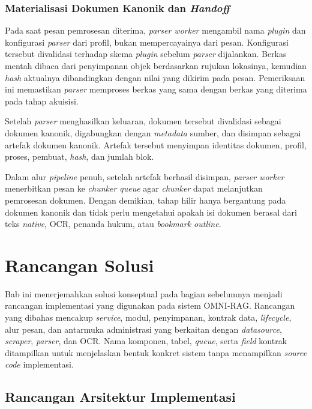 \subsubsection{Materialisasi Dokumen Kanonik dan \textit{Handoff}}
\label{sec:solusi-penyerahan-parser}

Pada saat pesan pemrosesan diterima, \textit{parser worker} mengambil nama \textit{plugin} dan konfigurasi \textit{parser} dari profil, bukan mempercayainya dari pesan.
Konfigurasi tersebut divalidasi terhadap skema \textit{plugin} sebelum \textit{parser} dijalankan.
Berkas mentah dibaca dari penyimpanan objek berdasarkan rujukan lokasinya, kemudian \textit{hash} aktualnya dibandingkan dengan nilai yang dikirim pada pesan.
Pemeriksaan ini memastikan \textit{parser} memproses berkas yang sama dengan berkas yang diterima pada tahap akuisisi.

Setelah \textit{parser} menghasilkan keluaran, dokumen tersebut divalidasi sebagai dokumen kanonik, digabungkan dengan \textit{metadata} sumber, dan disimpan sebagai artefak dokumen kanonik.
Artefak tersebut menyimpan identitas dokumen, profil, proses, pembuat, \textit{hash}, dan jumlah blok.

Dalam alur \textit{pipeline} penuh, setelah artefak berhasil disimpan, \textit{parser worker} menerbitkan pesan ke \textit{chunker queue} agar \textit{chunker} dapat melanjutkan pemrosesan dokumen.
Dengan demikian, tahap hilir hanya bergantung pada dokumen kanonik dan tidak perlu mengetahui apakah isi dokumen berasal dari teks \textit{native}, OCR, penanda hukum, atau \textit{bookmark outline}.

\section{Rancangan Solusi}
\label{sec:rancangan-solusi}

Bab ini menerjemahkan solusi konseptual pada bagian sebelumnya menjadi rancangan implementasi yang digunakan pada sistem OMNI-RAG.
Rancangan yang dibahas mencakup \textit{service}, modul, penyimpanan, kontrak data, \textit{lifecycle}, alur pesan, dan antarmuka administrasi yang berkaitan dengan \textit{datasource}, \textit{scraper}, \textit{parser}, dan OCR.
Nama komponen, tabel, \textit{queue}, serta \textit{field} kontrak ditampilkan untuk menjelaskan bentuk konkret sistem tanpa menampilkan \textit{source code} implementasi.

\subsection{Rancangan Arsitektur Implementasi}
\label{sec:rancangan-arsitektur-implementasi}

